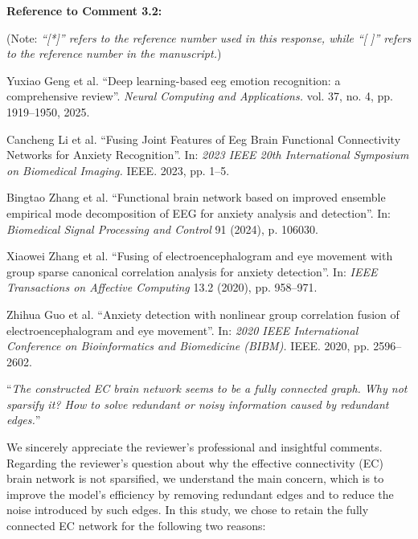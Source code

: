 \documentclass[12pt,technote,onecolumn]{IEEEtran}
\begin{document}
\vspace{1mm}

\noindent \textbf{Reference to Comment 3.2:} 

\noindent(Note: \textit{``[*]'' refers to the reference number used in this response, while ``[ ]'' refers to the reference number in the manuscript.})

\noindent[*1]\:Yuxiao Geng et al. ``Deep learning-based eeg emotion recognition: a comprehensive review”. \textit{Neural Computing and
Applications.} vol. 37, no. 4, pp. 1919–1950, 2025.

\noindent[72]\:Cancheng Li et al. ``Fusing Joint Features of Eeg Brain
Functional Connectivity Networks for Anxiety Recognition”.
In:\textit{ 2023 IEEE 20th International Symposium
on Biomedical Imaging.} IEEE. 2023, pp. 1–5. 

\noindent[73]\:Bingtao Zhang et al. ``Functional brain network based
on improved ensemble empirical mode decomposition
of EEG for anxiety analysis and detection”. In:\textit{ Biomedical
Signal Processing and Control} 91 (2024), p. 106030.

\noindent[74]\:Xiaowei Zhang et al. ``Fusing of electroencephalogram
and eye movement with group sparse canonical correlation
analysis for anxiety detection”. In: \textit{IEEE Transactions
on Affective Computing} 13.2 (2020), pp. 958–971.

\noindent[75]\:Zhihua Guo et al. ``Anxiety detection with nonlinear
group correlation fusion of electroencephalogram and
eye movement”. In: \textit{2020 IEEE International Conference
on Bioinformatics and Biomedicine (BIBM).} IEEE.
2020, pp. 2596–2602.


\vspace{4mm}
\newpage

 ``{\it The constructed EC brain network seems to be a fully connected graph. Why not sparsify it? How to solve redundant or noisy information caused by redundant edges.}''
\vspace{1mm}

We sincerely appreciate the reviewer’s professional and insightful comments. Regarding the reviewer’s question about why the effective connectivity (EC) brain network is not sparsified, we understand the main concern, which is to improve the model’s efficiency by removing redundant edges and to reduce the noise introduced by such edges. In this study, we chose to retain the fully connected EC network for the following two reasons:
\end{document}
